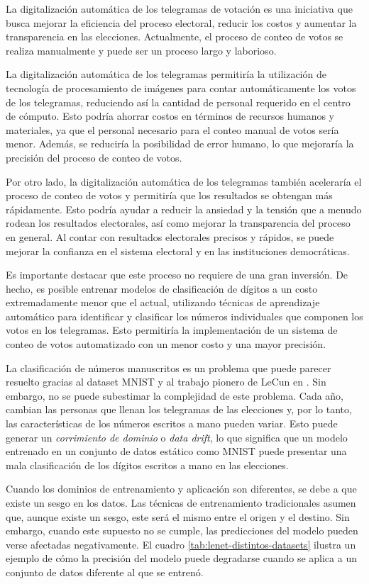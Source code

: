 La digitalización automática de los telegramas de votación es una iniciativa que busca mejorar la eficiencia del
proceso electoral, reducir los costos y aumentar la transparencia en las elecciones. Actualmente, el proceso de conteo
de votos se realiza manualmente y puede ser un proceso largo y laborioso.

La digitalización automática de los telegramas permitiría la utilización de tecnología de procesamiento de imágenes
para contar automáticamente los votos de los telegramas, reduciendo así la cantidad de personal requerido en el centro
de cómputo. Esto podría ahorrar costos en términos de recursos humanos y materiales, ya que el personal necesario para
el conteo manual de votos sería menor. Además, se reduciría la posibilidad de error humano, lo que mejoraría la
precisión del proceso de conteo de votos.

Por otro lado, la digitalización automática de los telegramas también aceleraría el proceso de conteo de votos y
permitiría que los resultados se obtengan más rápidamente. Esto podría ayudar a reducir la ansiedad y la tensión que a
menudo rodean los resultados electorales, así como mejorar la transparencia del proceso en general. Al contar con
resultados electorales precisos y rápidos, se puede mejorar la confianza en el sistema electoral y en las instituciones
democráticas.

Es importante destacar que este proceso no requiere de una gran inversión. De hecho, es posible entrenar modelos de
clasificación de dígitos a un costo extremadamente menor que el actual, utilizando técnicas de aprendizaje automático
para identificar y clasificar los números individuales que componen los votos en los telegramas. Esto permitiría la
implementación de un sistema de conteo de votos automatizado con un menor costo y una mayor precisión.

La clasificación de números manuscritos es un problema que puede parecer resuelto gracias al dataset MNIST y al trabajo
pionero de LeCun en \citeyear{lecun1998gradient}. Sin embargo, no se puede subestimar la complejidad de este problema.
Cada año, cambian las personas que llenan los telegramas de las elecciones y, por lo tanto, las características de los
números escritos a mano pueden variar. Esto puede generar un {\it corrimiento de dominio} o {\it data drift}, lo que
significa que un modelo entrenado en un conjunto de datos estático como MNIST puede presentar una mala clasificación de
los dígitos escritos a mano en las elecciones.

Cuando los dominios de entrenamiento y aplicación son diferentes, se debe a que existe un sesgo en los datos. Las
técnicas de entrenamiento tradicionales asumen que, aunque existe un sesgo, este será el mismo entre el origen y el
destino. Sin embargo, cuando este supuesto no se cumple, las predicciones del modelo pueden verse afectadas
negativamente. El cuadro \ref{tab:lenet-distintos-datasets} ilustra un ejemplo de cómo la precisión del modelo puede
degradarse cuando se aplica a un conjunto de datos diferente al que se entrenó.

